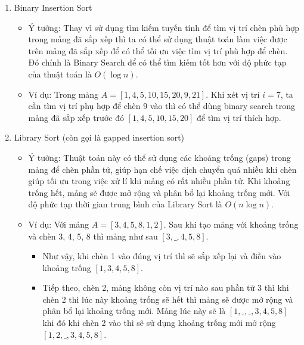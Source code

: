\begin{enumerate}
    \item Binary Insertion Sort
    \begin{itemize}
        \item Ý tưởng: Thay vì sử dụng tìm kiếm tuyến tính để tìm vị trí 
        chèn phù hợp trong mảng đã sắp xếp thì ta có thể sử dụng thuật 
        toán làm việc được trên mảng đã sắp xếp để có thể tối ưu việc 
        tìm vị trí phù hợp để chèn. Đó chính là Binary Search để có 
        thể tìm kiếm tốt hơn với độ phức tạp của thuật toán là 
        $O\left(\log{n}\right)$.
        \item Ví dụ: Trong mảng $A=\left[1,4,5,10,15,20,9,21\right]$. 
        Khi xét vị trí $i=7$, ta cần tìm vị trí phụ hợp để chèn 9 
        vào thì có thể dùng binary search trong mảng đã sắp xếp trước 
        đó $\left[1,4,5,10,15,20\right]$ để tìm vị trí thích hợp.
    \end{itemize}
    \item Library Sort (còn gọi là gapped insertion sort)
    \begin{itemize}
        \item Ý tưởng: Thuật toán này có thể sử dụng các khoảng trống 
        (gaps) trong mảng để chèn phần tử, giúp hạn chế việc dịch 
        chuyển quá nhiều khi chèn giúp tối ưu trong việc xử lí khi 
        mảng có rất nhiều phần tử. Khi khoảng trống hết, mảng sẽ được 
        mở rộng và phân bổ lại khoảng trống mới. Với độ phức tạp thời 
        gian trung bình của Library Sort là $O\left(n\log{n}\right)$.
        \item Ví dụ: Với mảng $A=\left[3,4,5,8,1,2\right]$. Sau khi 
        tạo mảng với khoảng trống và chèn 3, 4, 5, 8 thì mảng 
        như sau $\left[3,\_,4,5,8\right]$.
        \begin{itemize}[label=$\circ$]
            \item Như vậy, khi chèn 1 vào đúng vị trí thì sẽ sắp xếp 
            lại và điền vào khoảng trống $\left[1,3,4,5,8\right]$.
            \item Tiếp theo, chèn 2, mảng không còn vị trí nào sau 
            phần tử 3 thì khi chèn 2 thì lúc này khoảng trống sẽ hết 
            thì mảng sẽ được mở rộng và phân bổ lại khoảng trống mới. 
            Mảng lúc này sẽ là $\left[1,\_,\_,3,4,5,8\right]$ khi đó 
            khi chèn 2 vào thì sẽ sử dụng khoảng trống mới mở rộng 
            $\left[1,2,\_,3,4,5,8\right]$.
        \end{itemize}
    \end{itemize}
\end{enumerate}